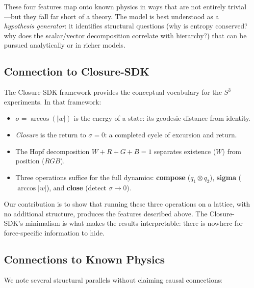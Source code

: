 \documentclass[letterpaper,12pt]{article}
\begin{document}
These four features map onto known physics in ways that are not entirely trivial---but they fall far short of a theory. The model is best understood as a \emph{hypothesis generator}: it identifies structural questions (why is entropy conserved? why does the scalar/vector decomposition correlate with hierarchy?) that can be pursued analytically or in richer models.

\subsection{Connection to Closure-SDK}

The Closure-SDK framework \cite{daSilva2025} provides the conceptual vocabulary for the $S^3$ experiments. In that framework:

\begin{itemize}
  \item $\sigma = \arccos(|w|)$ is the energy of a state: its geodesic distance from identity.
  \item \emph{Closure} is the return to $\sigma = 0$: a completed cycle of excursion and return.
  \item The Hopf decomposition $W + R + G + B = 1$ separates existence ($W$) from position ($RGB$).
  \item Three operations suffice for the full dynamics: \textbf{compose} ($q_1 \otimes q_2$), \textbf{sigma} ($\arccos|w|$), and \textbf{close} (detect $\sigma \to 0$).
\end{itemize}

Our contribution is to show that running these three operations on a lattice, with no additional structure, produces the features described above. The Closure-SDK's minimalism is what makes the results interpretable: there is nowhere for force-specific information to hide.

\subsection{Connections to Known Physics}

We note several structural parallels without claiming causal connections:
\end{document}
